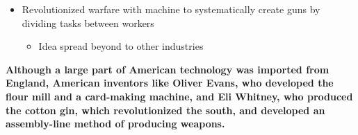 \documentclass[a4paper]{article}
\begin{document}
{\begin{itemize}
\begin{itemize}
\begin{itemize}
\begin{itemize}
                        \item Cotton spread beyond South with eightfold production increase; slavery began to grow 
                        \item In north, cotton gin had effect of promoting textile industry, with most northern plantation owners focusing on manufacturing textiles -> greater regional split
                    \end{itemize}
                    \item Revolutionized warfare with machine to systematically create guns by dividing tasks between workers
                    \begin{itemize}
                        \item Idea spread beyond to other industries
                    \end{itemize}
                \end{itemize}
            \end{itemize}
        \end{itemize}
        \textbf{Although a large part of American technology was imported from England, American inventors like Oliver Evans, who developed the flour mill and a card-making machine, and Eli Whitney, who produced the cotton gin, which revolutionized the south, and developed an assembly-line method of producing weapons.}}
\end{document}
